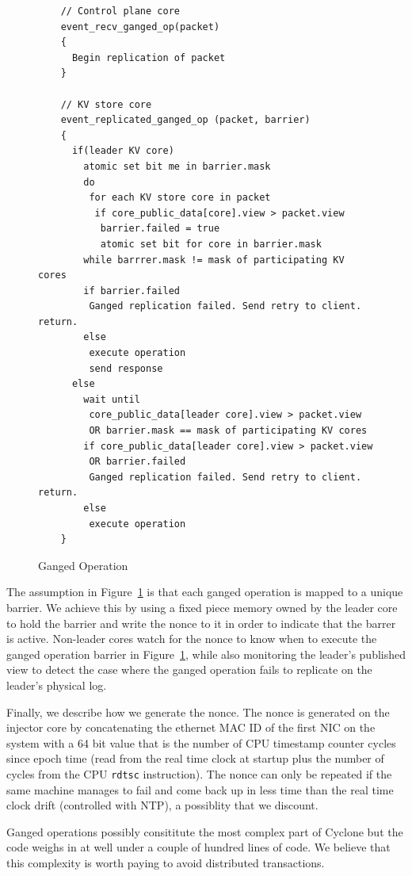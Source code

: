\documentclass[10pt, preprint, nonatbib]{sigplanconf}
\begin{document}
\begin{figure}
  \centering
\begin{verbatim}
    // Control plane core
    event_recv_ganged_op(packet)
    {
      Begin replication of packet
    }

    // KV store core
    event_replicated_ganged_op (packet, barrier)
    {
      if(leader KV core)
        atomic set bit me in barrier.mask         
        do
         for each KV store core in packet
          if core_public_data[core].view > packet.view
           barrier.failed = true 
           atomic set bit for core in barrier.mask
        while barrrer.mask != mask of participating KV cores
        if barrier.failed
         Ganged replication failed. Send retry to client. return.
        else       
         execute operation
         send response
      else
        wait until 
         core_public_data[leader core].view > packet.view
         OR barrier.mask == mask of participating KV cores
        if core_public_data[leader core].view > packet.view
         OR barrier.failed
         Ganged replication failed. Send retry to client. return.
        else
         execute operation
    }
\end{verbatim}
\caption{Ganged Operation}
\label{fig:ganged_ops}
\end{figure}

The assumption in Figure~\ref{fig:ganged_ops} is that each ganged operation is
mapped to a unique barrier. We achieve this by using a fixed piece memory owned
by the leader core to hold the barrier and write the nonce to it in order to
indicate that the barrer is active. Non-leader cores watch for the nonce to know
when to execute the ganged operation barrier in Figure~\ref{fig:ganged_ops},
while also monitoring the leader's published view to detect the case where the
ganged operation fails to replicate on the leader's physical log.

Finally, we describe how we generate the nonce. The nonce is generated on the
injector core by concatenating the ethernet MAC ID of the first NIC on the
system with a 64 bit value that is the number of CPU timestamp counter cycles
since epoch time (read from the real time clock at startup plus the number of
cycles from the CPU {\tt rdtsc} instruction). The nonce can only be repeated if
the same machine manages to fail and come back up in less time than the real
time clock drift (controlled with NTP), a possiblity that we discount.

Ganged operations possibly consititute the most complex part of Cyclone but the
code weighs in at well under a couple of hundred lines of code. We believe that
this complexity is worth paying to avoid distributed transactions.
\end{document}
